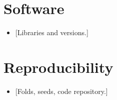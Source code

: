 \section{Software}
\begin{itemize}
    \item {[}Libraries and versions.]
\end{itemize}

\section{Reproducibility}
\begin{itemize}
    \item {[}Folds, seeds, code repository.]
\end{itemize}

